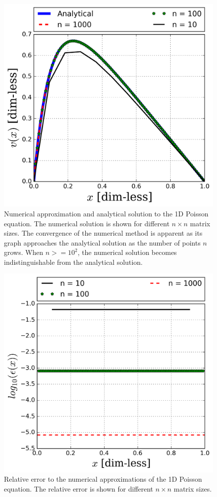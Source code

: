 \documentclass[a4paper]{article}
\begin{document}
\begin{figure}[H]
  \centering
  \includegraphics[width=\columnwidth]{Results_general.png}
  \caption{Numerical approximation and analytical solution to the 1D Poisson equation. The numerical solution is shown for different $n \times n$ matrix sizes. The convergence of the numerical method is
    apparent as its graph approaches the analytical solution as the number of points \(n\) grows. When \(n
    >= 10^{2}\), the numerical solution becomes indistinguishable from the analytical solution.}
    \label{fig1}
\end{figure}

\begin{figure}[H]
  \centering
  \includegraphics[width=\columnwidth]{RelativeError_general.png}
  \caption{ Relative error to the numerical approximations of the 1D Poisson equation. The relative error is shown for different $n \times n$ matrix sizes.}
  \label{fig2}
\end{figure}
\end{document}
